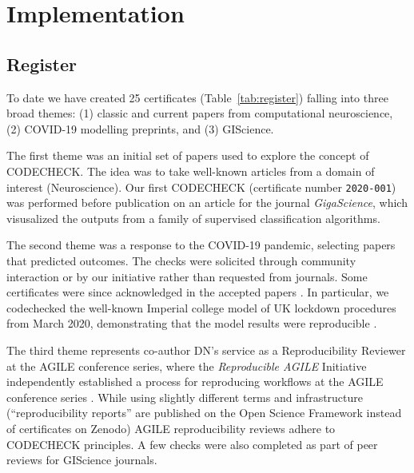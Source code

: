 \documentclass[12pt]{article}
\begin{document}
\section*{Implementation}\label{implementation}

\subsection*{Register}\label{register}

To date we have created 25 certificates (Table~\ref{tab:register}) 
falling into three broad themes: (1) classic and current
papers from computational neuroscience, (2) COVID-19 modelling
preprints, and (3) GIScience.

The first theme was an initial set of papers used to explore the
concept of CODECHECK.  The idea was to take well-known articles from a
domain of interest (Neuroscience).  Our first CODECHECK (certificate
number \texttt{2020-001}) was performed before publication on an
article for the journal \emph{GigaScience}, which visusalized the
outputs from a family of supervised classification algorithms.

The second theme was a response to the COVID-19 pandemic, selecting
papers that predicted outcomes. The checks were solicited through
community interaction or by our initiative rather than requested from
journals.  Some certificates were since acknowledged in the accepted
papers \cite{Davies2020-vj,kucharski_effectiveness_2020}. In
particular, we codechecked the well-known Imperial college model of UK
lockdown procedures from March 2020,
demonstrating that the model results were reproducible
\cite{Chawla2020-hi,cert-2020-010}.

The third theme represents co-author DN's service as a Reproducibility
Reviewer at the AGILE conference series, where the \emph{Reproducible
  AGILE} Initiative \cite{reproducible_agile} independently
established a process for reproducing workflows at the AGILE
conference series \cite{nust_improving_2020}.  While using slightly
different terms and infrastructure (``reproducibility reports'' are
published on the Open Science Framework instead of certificates
on Zenodo) AGILE reproducibility reviews adhere to CODECHECK
principles.  A few checks were also completed as part of peer reviews
for GIScience journals.
\end{document}
